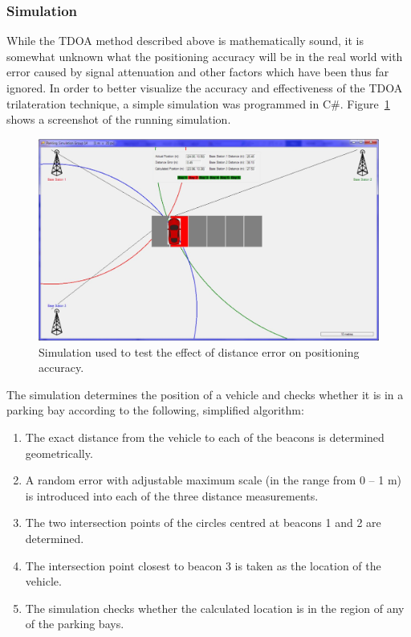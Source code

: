 
\newpage
\subsubsection{Simulation}

While the TDOA method described above is mathematically sound, it is somewhat unknown what the positioning accuracy will be in the real world with error caused by signal attenuation and other factors which have been thus far ignored. In order to better visualize the accuracy and effectiveness of the TDOA trilateration technique, a simple simulation was programmed in C\#. Figure~\ref{fig:distance-error} shows a screenshot of the running simulation.

\begin{figure}[H]
\begin{center}
\includegraphics[scale=0.4]{data/software/3.jpg}
\caption{Simulation used to test the effect of distance error on positioning accuracy.}
\label{fig:distance-error}
\end{center}
\end{figure}






The simulation determines the position of a vehicle and checks whether it is in a parking bay according to the following, simplified algorithm:

\begin{enumerate}
\item The exact distance from the vehicle to each of the beacons is determined geometrically.
\item A random error with adjustable maximum scale (in the range from 0 – 1 m) is introduced into each of the three distance measurements.
\item The two intersection points of the circles centred at beacons 1 and 2 are determined.
\item The intersection point closest to beacon 3 is taken as the location of the vehicle.
\item The simulation checks whether the calculated location is in the region of any of the parking bays.
\end{enumerate}

